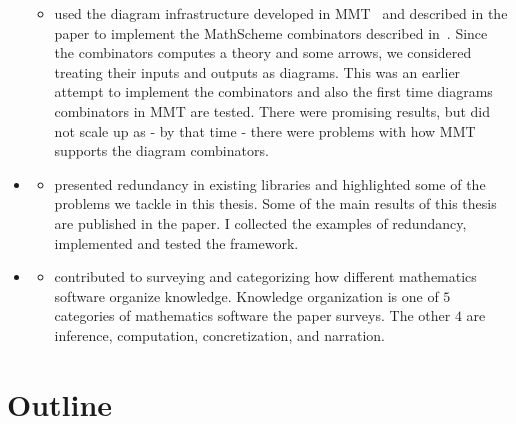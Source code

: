 \begin{itemize}
    \begin{itemize}
    \item[] used the diagram infrastructure developed in MMT~\cite{MMT} and described in the paper to implement the MathScheme combinators described in~\cite{carette2018building}. Since the combinators computes a theory and some arrows, we considered treating their inputs and outputs as diagrams.
This was an earlier attempt to implement the combinators and also the first time diagrams combinators in MMT are tested.  There were promising results, but did not scale up as - by that time - there were problems with how MMT supports the diagram combinators. 
    \end{itemize}        
    \item \cite{leverageCICM2020} 
    \begin{itemize}
    \item[]  presented redundancy in existing libraries and highlighted some of the problems we tackle in this thesis. Some of the main results of this thesis are published in the paper. I collected the examples of redundancy, implemented and tested the framework.
    \end{itemize} 
    \item \cite{bercic2020space} 
    \begin{itemize}
    \item[] contributed to surveying and categorizing how different mathematics software organize knowledge. Knowledge organization is one of $5$ categories of mathematics software the paper surveys. The other $4$ are inference, computation, concretization, and narration. 
    \end{itemize}        
\end{itemize}

\section{Outline}

